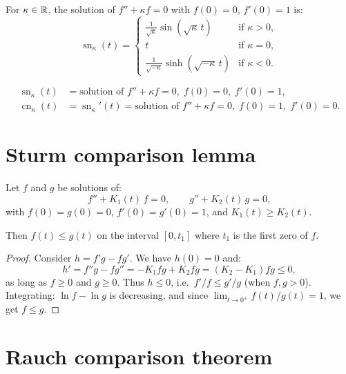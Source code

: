 \begin{definition}
For $\kappa \in \mathbb{R}$, the solution of $f'' + \kappa f = 0$ with $f(0) = 0$,
$f'(0) = 1$ is:
\[
    \operatorname{sn}_\kappa(t) = \begin{cases}
    \frac{1}{\sqrt{\kappa}}\sin(\sqrt{\kappa}\, t) & \text{if } \kappa > 0, \\
    t & \text{if } \kappa = 0, \\
    \frac{1}{\sqrt{-\kappa}}\sinh(\sqrt{-\kappa}\, t) & \text{if } \kappa < 0.
    \end{cases}
\]
\end{definition}

\begin{keyformulas}[title=\textbf{Comparison functions}]
\begin{align*}
    \operatorname{sn}_\kappa(t) &= \text{solution of } f'' + \kappa f = 0, \; f(0)=0, \; f'(0)=1, \\
    \operatorname{cn}_\kappa(t) &= \operatorname{sn}_\kappa'(t) = \text{solution of }
    f'' + \kappa f = 0, \; f(0)=1, \; f'(0)=0.
\end{align*}
\end{keyformulas}

\section{Sturm comparison lemma}

\begin{lemma}[Sturm]
\label{lem:sturm}
Let $f$ and $g$ be solutions of:
\[
    f'' + K_1(t)\, f = 0, \qquad g'' + K_2(t)\, g = 0,
\]
with $f(0) = g(0) = 0$, $f'(0) = g'(0) = 1$, and $K_1(t) \geq K_2(t)$.

Then $f(t) \leq g(t)$ on the interval $[0, t_1]$ where $t_1$ is the first zero
of $f$.
\end{lemma}

\begin{proof}
Consider $h = f'g - fg'$. We have $h(0) = 0$ and:
\[
    h' = f''g - fg'' = -K_1 fg + K_2 fg = (K_2 - K_1)fg \leq 0,
\]
as long as $f \geq 0$ and $g \geq 0$. Thus $h \leq 0$, i.e.\ $f'/f \leq g'/g$
(when $f, g > 0$). Integrating: $\ln f - \ln g$ is decreasing, and since
$\lim_{t \to 0^+} f(t)/g(t) = 1$, we get $f \leq g$.
\end{proof}

\section{Rauch comparison theorem}

